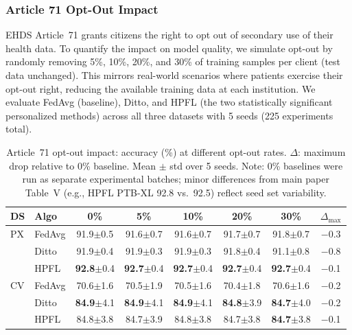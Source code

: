 \documentclass[conference]{IEEEtran}
\begin{document}
\subsubsection{Article 71 Opt-Out Impact}
\label{sec:optout}

EHDS Article~71 grants citizens the right to opt out of secondary use of their health data. To quantify the impact on model quality, we simulate opt-out by randomly removing 5\%, 10\%, 20\%, and 30\% of training samples per client (test data unchanged). This mirrors real-world scenarios where patients exercise their opt-out right, reducing the available training data at each institution. We evaluate FedAvg (baseline), Ditto, and HPFL (the two statistically significant personalized methods) across all three datasets with 5 seeds (225 experiments total).

\begin{table}[t]
\centering
\caption{Article~71 opt-out impact: accuracy (\%) at different opt-out rates. $\Delta$: maximum drop relative to 0\% baseline. Mean $\pm$ std over 5 seeds. Note: 0\% baselines were run as separate experimental batches; minor differences from main paper Table~V (e.g., HPFL PTB-XL 92.8 vs.\ 92.5) reflect seed set variability.}
\label{tab:optout}
\footnotesize
\begin{tabular}{ll ccccc c}
\toprule
\textbf{DS} & \textbf{Algo} & \textbf{0\%} & \textbf{5\%} & \textbf{10\%} & \textbf{20\%} & \textbf{30\%} & $\Delta_{\max}$ \\
\midrule
PX & FedAvg & 91.9{\tiny$\pm$0.5} & 91.6{\tiny$\pm$0.7} & 91.6{\tiny$\pm$0.7} & 91.7{\tiny$\pm$0.7} & 91.8{\tiny$\pm$0.7} & $-$0.3 \\
 & Ditto & 91.9{\tiny$\pm$0.4} & 91.9{\tiny$\pm$0.3} & 91.9{\tiny$\pm$0.3} & 91.8{\tiny$\pm$0.4} & 91.1{\tiny$\pm$0.8} & $-$0.8 \\
 & HPFL & \textbf{92.8}{\tiny$\pm$0.4} & \textbf{92.7}{\tiny$\pm$0.4} & \textbf{92.7}{\tiny$\pm$0.4} & \textbf{92.7}{\tiny$\pm$0.4} & \textbf{92.7}{\tiny$\pm$0.4} & $-$0.1 \\
\midrule
CV & FedAvg & 70.6{\tiny$\pm$1.6} & 70.5{\tiny$\pm$1.9} & 70.5{\tiny$\pm$1.6} & 70.4{\tiny$\pm$1.8} & 70.6{\tiny$\pm$1.6} & $-$0.2 \\
 & Ditto & \textbf{84.9}{\tiny$\pm$4.1} & \textbf{84.9}{\tiny$\pm$4.1} & \textbf{84.9}{\tiny$\pm$4.1} & \textbf{84.8}{\tiny$\pm$3.9} & \textbf{84.7}{\tiny$\pm$4.0} & $-$0.2 \\
 & HPFL & 84.8{\tiny$\pm$3.8} & 84.7{\tiny$\pm$3.9} & 84.8{\tiny$\pm$3.8} & 84.7{\tiny$\pm$3.8} & \textbf{84.7}{\tiny$\pm$3.8} & $-$0.1 \\

\end{tabular}
\end{table}
\end{document}
